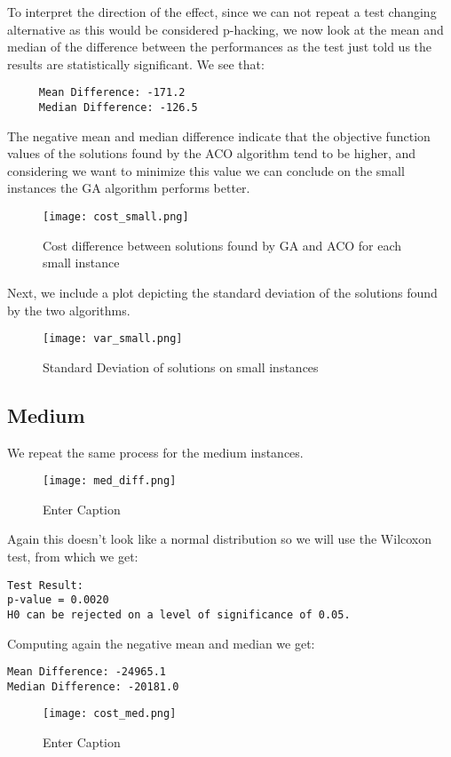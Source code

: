 \documentclass{article}
\begin{document}
 To interpret the direction of the effect, since we can not repeat a test changing alternative as this would be considered p-hacking, we now look at the mean and median of the difference between the performances as the test just told us the results are statistically significant. 
 We see that:
 \begin{verbatim}
     Mean Difference: -171.2 
     Median Difference: -126.5 
 \end{verbatim}

 The negative mean and median difference indicate that the objective function values of the solutions found by the ACO algorithm tend to be higher, and considering we want to minimize this value we can conclude on the small instances the GA algorithm performs better.
 \begin{figure}[H]
     \centering
     \texttt{[image: cost\_small.png]}
     \caption{Cost difference between solutions found by GA and ACO for each small instance}
     \label{fig:enter-label}
 \end{figure}

Next, we include a plot depicting the standard deviation of the solutions found by the two algorithms.
 \begin{figure}[H]
     \centering
     \texttt{[image: var\_small.png]}
     \caption{Standard Deviation of solutions on small instances}
     \label{fig:enter-label}
 \end{figure}
 
\subsection{Medium}

We repeat the same process for the medium instances.
\begin{figure}[H]
    \centering
    \texttt{[image: med\_diff.png]}
    \caption{Enter Caption}
    \label{fig:enter-label}
\end{figure}
Again this doesn't look like a normal distribution so we will use the Wilcoxon test, from which we get:
\begin{verbatim}
Test Result: 
p-value = 0.0020 
H0 can be rejected on a level of significance of 0.05. 
\end{verbatim}
Computing again the negative mean and median we get:
\begin{verbatim}
Mean Difference: -24965.1 
Median Difference: -20181.0 
\end{verbatim}
\begin{figure}[H]
    \centering
    \texttt{[image: cost\_med.png]}
    \caption{Enter Caption}
    \label{fig:enter-label}
\end{figure}
\end{document}
